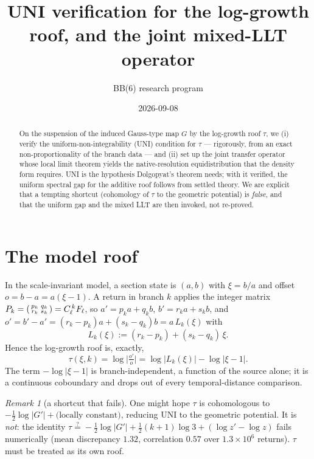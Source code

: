 \documentclass[11pt]{article}
\title{\bfseries UNI verification for the log-growth roof, and the joint mixed-LLT operator}
\author{BB(6) research program}\date{2026-09-08}
\theoremstyle{remark}\newtheorem{remark}{Remark}
\begin{document}
\maketitle
\begin{abstract}
On the suspension of the induced Gauss-type map $G$ by the log-growth roof
$\tau$, we (i) verify the uniform-non-integrability (UNI) condition for $\tau$
--- rigorously, from an exact non-proportionality of the branch data --- and
(ii) set up the joint transfer operator whose local limit theorem yields the
native-resolution equidistribution that the density form requires. UNI is the
hypothesis Dolgopyat's theorem needs; with it verified, the uniform spectral
gap for the additive roof follows from settled theory. We are explicit that a
tempting shortcut (cohomology of $\tau$ to the geometric potential) is
\emph{false}, and that the uniform gap and the mixed LLT are then invoked, not
re-proved.
\end{abstract}

\section{The model roof}
In the scale-invariant model, a section state is $(a,b)$ with $\xi=b/a$ and
offset $o=b-a=a(\xi-1)$. A return in branch $k$ applies the integer matrix
$P_k=\begin{psmallmatrix}p_k&q_k\\ r_k&s_k\end{psmallmatrix}=C_\ell^{\,k}F_\ell$,
so $a'=p_ka+q_kb$, $b'=r_ka+s_kb$, and $o'=b'-a'=(r_k-p_k)a+(s_k-q_k)b
=a\,L_k(\xi)$ with
\[
L_k(\xi):=(r_k-p_k)+(s_k-q_k)\,\xi .
\]
Hence the log-growth roof is, exactly,
\begin{equation}\label{eq:tau}
\tau(\xi,k)=\log\Big|\tfrac{o'}{o}\Big|=\log|L_k(\xi)|-\log|\xi-1|.
\end{equation}
The term $-\log|\xi-1|$ is branch-independent, a function of the source alone;
it is a continuous coboundary and drops out of every temporal-distance
comparison.

\begin{remark}[a shortcut that fails]
One might hope $\tau$ is cohomologous to $-\tfrac12\log|G'|+\text{(locally
constant)}$, reducing UNI to the geometric potential. It is \emph{not}: the
identity $\tau\overset?=-\tfrac12\log|G'|+\tfrac12(k{+}1)\log3+(\log z'-\log
z)$ fails numerically (mean discrepancy $1.32$, correlation $0.57$ over
$1.3\times10^6$ returns). $\tau$ must be treated as its own roof.
\end{remark}
\end{document}
